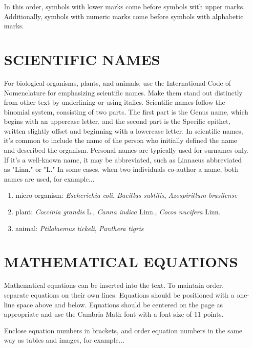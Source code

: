 In this order, symbols with lower marks come before symbols with upper marks. Additionally, symbols with numeric marks come before symbols with alphabetic marks.

\section{SCIENTIFIC NAMES}

For biological organisms, plants, and animals, use the International Code of Nomenclature for emphasizing scientific names. Make them stand out distinctly from other text by underlining or using italics. Scientific names follow the binomial system, consisting of two parts. The first part is the Genus name, which begins with an uppercase letter, and the second part is the Specific epithet, written slightly offset and beginning with a lowercase letter. In scientific names, it's common to include the name of the person who initially defined the name and described the organism. Personal names are typically used for surnames only. If it's a well-known name, it may be abbreviated, such as Linnaeus abbreviated as "Linn." or "L." In some cases, when two individuals co-author a name, both names are used, for example...

\begin{enumerate}[label=\alph*.]
    \item micro-organism: \textit{Escherichia coli}, \textit{Bacillus subtilis}, \textit{Azospirillum brasilense}
    \item plant: \textit{Coccinia grandis} L., \textit{Canna indica} Linn., \textit{Cocos nucifera} Linn.
    \item animal: \textit{Ptilolaemus tickeli}, \textit{Panthera tigris}
\end{enumerate}

\section{MATHEMATICAL EQUATIONS}

Mathematical equations can be inserted into the text. To maintain order, separate equations on their own lines. Equations should be positioned with a one-line space above and below. Equations should be centered on the page as appropriate and use the Cambria Math font with a font size of 11 points.

Enclose equation numbers in brackets, and order equation numbers in the same way as tables and images, for example...

